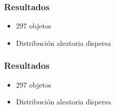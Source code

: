 \begin{frame}
    \frametitle{Resultados}
    \begin{itemize}
    \item 297 objetos
    \item Distribución aleatoria dispersa
    \end{itemize}
    \endblock{}
		\begin{center}
		\end{center}
\end{frame}

\begin{frame}
    \frametitle{Resultados}
    \begin{itemize}
    \item 297 objetos
    \item Distribución aleatoria dispersa
    \end{itemize}
    \endblock{}
		\begin{center}
		\end{center}
\end{frame}

